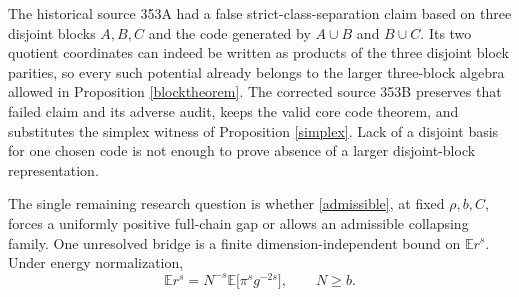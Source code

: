 \documentclass[11pt]{article}
\newcommand{\E}{\mathbb E}
\begin{document}
The historical source 353A had a false strict-class-separation claim based on three disjoint blocks $A,B,C$ and the code generated by $A\cup B$ and $B\cup C$. Its two quotient coordinates can indeed be written as products of the three disjoint block parities, so every such potential already belongs to the larger three-block algebra allowed in Proposition \ref{blocktheorem}. The corrected source 353B preserves that failed claim and its adverse audit, keeps the valid core code theorem, and substitutes the simplex witness of Proposition \ref{simplex}. Lack of a disjoint basis for one chosen code is not enough to prove absence of a larger disjoint-block representation.

The single remaining research question is whether \eqref{admissible}, at fixed $\rho,b,C$, forces a uniformly positive full-chain gap or allows an admissible collapsing family. One unresolved bridge is a finite dimension-independent bound on $\E r^s$. Under energy normalization,
\[
 \E r^s=N^{-s}\E\bigl[\pi^s g^{-2s}\bigr],\qquad N\geq b.
\]
\end{document}
